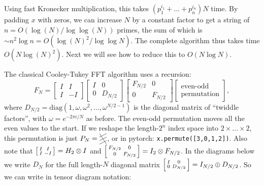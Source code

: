 Using fast Kronecker multiplication, this takes $(p_1^{i_1}+\dots+p_n^{i_n}) N$ time.
By padding $x$ with zeros, we can increase $N$ by a constant factor to get a string of $n=O(\log(N)/\log\log(N))$ primes, the sum of which is $\sim n^2\log n = O(\log(N)^2/\log\log N)$.
The complete algorithm thus takes time $O(N \log(N)^2)$.
Next we will see how to reduce this to $O(N\log N)$.

The classical Cooley-Tukey FFT algorithm uses a recursion:
\[
   \renewcommand*{\arraystretch}{1.3}
F_N =
\begin{bmatrix}
I & I \\
I & -I
\end{bmatrix}
\begin{bmatrix}
I & 0 \\
0 & D_{N/2}
\end{bmatrix}
\begin{bmatrix}
F_{N/2} & 0 \\
0 & F_{N/2}
\end{bmatrix}
\begin{bmatrix}
\text{even-odd} \\
\text{permutation}
\end{bmatrix}
,
\]
where $D_{N/2} = \mathrm{diag}(1, \omega, \omega^2, \dots, \omega^{N/2-1})$ is the diagonal matrix of ``twiddle factors'', with $\omega = e^{-2\pi i/N}$ as before.
The even-odd permutation moves all the even values to the start.
If we reshape the length-$2^n$ index space into $2\times\dots\times 2$, this permutation is just
$
P_N = \begin{tikzpicture}[baseline=.5em, x=1em, y=.5em]
    \draw (0,0) -- (1, 1);
    \draw (0,1) -- (1, 2);
    \draw (0,2) -- (1, 3);
    \draw (0,3) -- (1, 0);
\end{tikzpicture}
$,
or in pytorch: \texttt{x.permute([3,0,1,2])}.
Also note that
$\left[\begin{smallmatrix}I&I\\I&-I\end{smallmatrix}\right] = H_2 \otimes I$ and $\left[\begin{smallmatrix}F_{N/2} & 0\\0&F_{N/2}\end{smallmatrix}\right]=I_2 \otimes F_{N/2}$.
In the diagrams below we write $D_N$ for the full length-$N$ diagonal matrix $\left[\begin{smallmatrix}I&0\\0&D_{N/2}\end{smallmatrix}\right] = I_{N/2} \oplus D_{N/2}$.
So we can write in tensor diagram notation:

